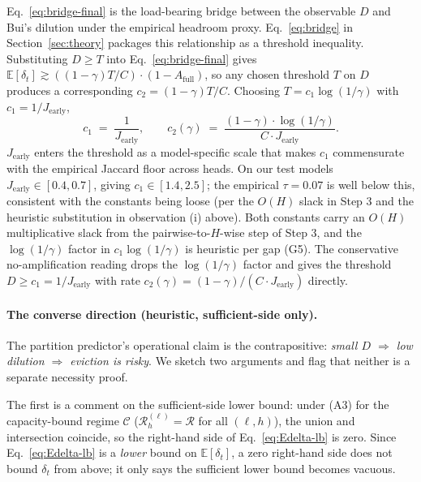 \documentclass{article} %
\begin{document}
Eq.~\eqref{eq:bridge-final} is the load-bearing bridge between the
observable $D$ and Bui's dilution under the empirical headroom proxy.
Eq.~\eqref{eq:bridge} in Section~\ref{sec:theory} packages this
relationship as a threshold inequality. Substituting $D \geq T$ into
Eq.~\eqref{eq:bridge-final} gives $\mathbb{E}[\delta_t] \gtrsim
((1 - \gamma) T / C) \cdot (1 - A_{\mathrm{full}})$, so any chosen
threshold $T$ on $D$ produces a corresponding $c_2 = (1 - \gamma) T /
C$. Choosing $T = c_1 \log(1/\gamma)$ with $c_1 = 1/J_{\text{early}}$,
\begin{equation}
\label{eq:c1c2}
\boxed{
c_1 \;=\; \frac{1}{J_{\text{early}}}, \qquad
c_2(\gamma) \;=\; \frac{(1 - \gamma) \cdot \log(1/\gamma)}{C \cdot J_{\text{early}}}.
}
\end{equation}
$J_{\text{early}}$ enters the threshold as a model-specific scale that
makes $c_1$ commensurate with the empirical Jaccard floor across heads.
On our test models $J_{\text{early}} \in [0.4, 0.7]$, giving $c_1 \in
[1.4, 2.5]$; the empirical $\tau = 0.07$ is well below this, consistent
with the constants being loose (per the $O(H)$ slack in Step 3 and the
heuristic substitution in observation (i) above). Both constants carry
an $O(H)$ multiplicative slack from the pairwise-to-$H$-wise step of
Step 3, and the $\log(1/\gamma)$ factor in $c_1 \log(1/\gamma)$ is
heuristic per gap (G5). The conservative no-amplification reading drops
the $\log(1/\gamma)$ factor and gives the threshold $D \geq c_1 =
1/J_{\text{early}}$ with rate $c_2(\gamma) = (1 - \gamma)/(C \cdot
J_{\text{early}})$ directly.

\paragraph{The converse direction (heuristic, sufficient-side only).}
The partition predictor's operational claim is the contrapositive:
\emph{small $D$ $\Rightarrow$ low dilution $\Rightarrow$ eviction is
risky}. We sketch two arguments and flag that neither is a separate
necessity proof.

The first is a comment on the sufficient-side lower bound: under (A3)
for the capacity-bound regime $\mathcal{C}$ ($\mathcal{R}^{(\ell)}_h =
\mathcal{R}$ for all $(\ell, h)$), the union and intersection coincide,
so the right-hand side of Eq.~\eqref{eq:Edelta-lb} is zero. Since
Eq.~\eqref{eq:Edelta-lb} is a \emph{lower} bound on
$\mathbb{E}[\delta_t]$, a zero right-hand side does not bound
$\delta_t$ from above; it only says the sufficient lower bound becomes
vacuous.
\end{document}
